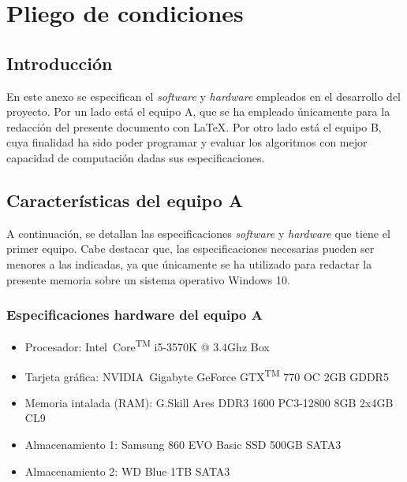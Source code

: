 \chapter{Pliego de condiciones}
\label{cha:pliego-de-condiciones}

\section{Introducción}
\label{sec:intro-pliego}

En este anexo se especifican el \textit{software} y \textit{hardware} empleados en el desarrollo del proyecto. Por un lado está el equipo A, que se ha empleado únicamente para la redacción del presente documento con \LaTeX. Por otro lado está el equipo B, cuya finalidad ha sido poder programar y evaluar los algoritmos con mejor capacidad de computación dadas sus especificaciones.

\section{Características del equipo A}
\label{sec:caracteristicas-equipoa}

A continuación, se detallan las especificaciones \textit{software} y \textit{hardware} que tiene el primer equipo. Cabe destacar que, las especificaciones necesarias pueden ser menores a las indicadas, ya que únicamente se ha utilizado para redactar la presente memoria sobre un sistema operativo Windows 10.

\subsection{Especificaciones hardware del equipo A}
\label{subsec:especificaciones-hardware-equipoa}
\begin{itemize}
    \item Procesador: Intel\textregistered\ Core\textsuperscript{TM} i5-3570K @ 3.4Ghz Box
    \item Tarjeta gráfica: NVIDIA\textregistered\ Gigabyte GeForce GTX\textsuperscript{TM} 770 OC 2GB GDDR5
    \item Memoria intalada (RAM): G.Skill Ares DDR3 1600 PC3-12800 8GB 2x4GB CL9
    \item Almacenamiento 1: Samsung 860 EVO Basic SSD 500GB SATA3
    \item Almacenamiento 2: WD Blue 1TB SATA3
\end{itemize}

